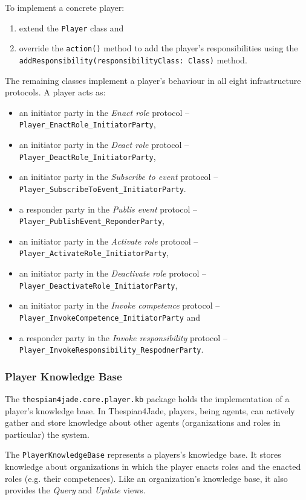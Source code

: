 To implement a concrete player:
\begin{enumerate}
	\item extend the \texttt{Player} class and
	\item override the \texttt{action()} method to add the player's responsibilities using the \texttt{addResponsibility(responsibilityClass: Class)} method.	
\end{enumerate}

The remaining classes implement a player's behaviour in all eight infrastructure protocols.
A player acts as:
\begin{itemize}
	\item an initiator party in the \textit{Enact role} protocol -- \texttt{Player\_EnactRole\_InitiatorParty},
	\item an initiator party in the \textit{Deact role} protocol -- \texttt{Player\_DeactRole\_InitiatorParty},
	\item an initiator party in the \textit{Subscribe to event} protocol -- \texttt{Player\_SubscribeToEvent\_InitiatorParty}.
	\item a responder party in the \textit{Publis event} protocol -- \texttt{Player\_PublishEvent\_ReponderParty},
	\item an initiator party in the \textit{Activate role} protocol -- \texttt{Player\_ActivateRole\_InitiatorParty},
	\item an initiator party in the \textit{Deactivate role} protocol -- \texttt{Player\_DeactivateRole\_InitiatorParty},
	\item an initiator party in the \textit{Invoke competence} protocol -- \texttt{Player\_InvokeCompetence\_InitiatorParty} and
	\item a responder party in the \textit{Invoke responsibility} protocol -- \texttt{Player\_InvokeResponsibility\_RespodnerParty}. 
\end{itemize}

\subsubsection{Player Knowledge Base}

The \texttt{thespian4jade.core.player.kb} package holds the implementation of a player's knowledge base.
In Thespian4Jade, players, being agents, can actively gather and store knowledge about other agents (organizations and roles in particular) the system.

The \texttt{PlayerKnowledgeBase} represents a players's knowledge base.
It stores knowledge about organizations in which the player enacts roles and the enacted roles (e.g. their competences).
Like an organization's knowledge base, it also provides the \textit{Query} and \textit{Update} views.

